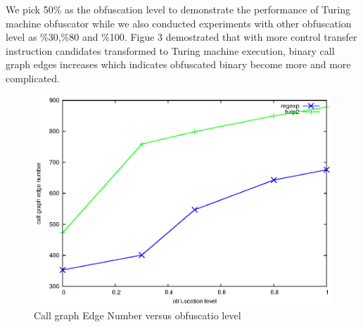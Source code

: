 \documentclass[lnicst]{svmultln}
\begin{document}
We pick 50\% as the obfuscation level to demonstrate the performance of Turing machine obfuscator while we also conducted experiments with other obfuscation level as \%30,\%80 and \%100. Figue 3 demostrated that with more control transfer instruction candidates transformed to Turing machine execution, binary call graph edges increases which indicates obfuscated binary become more and more complicated. 
\begin{figure}
  \includegraphics[width=0.9\linewidth]{cg.eps}
  \caption{Call graph Edge Number versus obfuscatio level}
  \label{Figure 3}
\end{figure}
\end{document}
